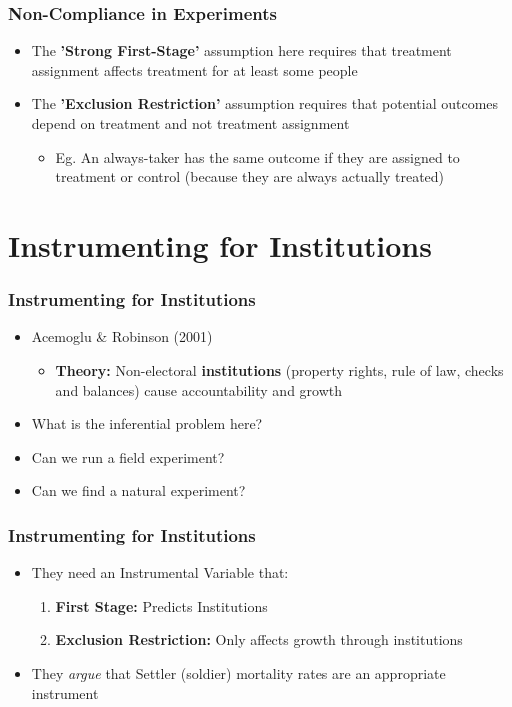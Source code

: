 \documentclass[xcolor=x11names,compress]{beamer}\usepackage[]{graphicx}\usepackage[]{color}
\renewcommand{\(}{\begin{columns}}
\renewcommand{\)}{\end{columns}}
\newcommand{\<}[1]{\begin{column}{#1}}
\renewcommand{\>}{\end{column}}
\begin{document}
\begin{frame}
\frametitle{Non-Compliance in Experiments}
\begin{itemize}
\item The \textbf{'Strong First-Stage'} assumption here requires that treatment assignment affects treatment for at least some people
\pause
\item The \textbf{'Exclusion Restriction'} assumption requires that potential outcomes depend on treatment and not treatment assignment
\begin{itemize}
\item Eg. An always-taker has the same outcome if they are assigned to treatment or control (because they are always actually treated)
\end{itemize}
\end{itemize}
\end{frame}


\section{Instrumenting for Institutions}

\begin{frame}
\frametitle{Instrumenting for Institutions}
\begin{itemize}
\item Acemoglu \& Robinson (2001)
\begin{itemize}
\item \textbf{Theory:} Non-electoral \textbf{institutions} (property rights, rule of law, checks and balances) cause accountability and growth
\pause
\end{itemize}
\item What is the inferential problem here?
\pause
\item Can we run a field experiment?
\pause
\item Can we find a natural experiment?
\end{itemize}
\end{frame}

\begin{frame}
\frametitle{Instrumenting for Institutions}
\begin{itemize}
\item They need an Instrumental Variable that:
\pause
\begin{enumerate}
\item \textbf{First Stage:} \pause Predicts Institutions
\pause
\item \textbf{Exclusion Restriction:} \pause Only affects growth through institutions
\end{enumerate}
\item They \textit{argue} that Settler (soldier) mortality rates are an appropriate instrument
\end{itemize}
\end{frame}
\end{document}
